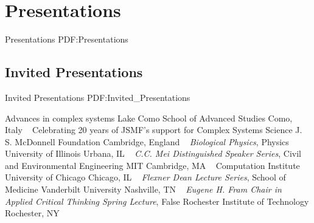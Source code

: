 \section
{Presentations}
{Presentations}
{PDF:Presentations}

\subsection
{Invited Presentations}
{Invited Presentations}
{PDF:Invited_Presentations}

\GapNoBreak
{}
Advances in complex systems
\newline
    Lake Como School of Advanced Studies
    \newline
Como, Italy
\newline
~
\Gap
{}
Celebrating 20 years of JSMF’s support for Complex Systems Science
\newline
    J. S. McDonnell Foundation
    \newline
Cambridge, England
\newline
~
\Gap
{}
\textit{Biological Physics}, Physics
\newline
    University of Illinois
    \newline
Urbana, IL
\newline
~
\Gap
{}
\textit{C.C. Mei Distinguished Speaker Series}, Civil and Environmental Engineering
\newline
    MIT
    \newline
Cambridge, MA
\newline
~
\Gap
{}
Computation Institute
\newline
    University of Chicago
    \newline
Chicago, IL
\newline
~
\Gap
{}
\textit{Flexner Dean Lecture Series}, School of Medicine
\newline
    Vanderbilt University
    \newline
Nashville, TN
\newline
~
\Gap
{}
\textit{Eugene H. Fram Chair in Applied Critical Thinking Spring Lecture}, False
\newline
    Rochester Institute of Technology
    \newline
Rochester, NY
\newline
